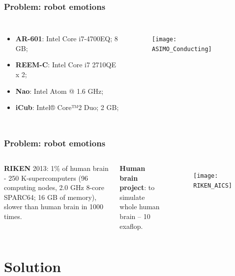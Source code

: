 \documentclass[12pt, aspectratio=169]{beamer}
\begin{document}
\begin{frame}
\frametitle{Problem: robot emotions}
\begin{columns}[c] %

\begin{itemize}
\item \textbf{AR-601}: Intel Core i7-4700EQ; 8 GB;
\item \textbf{REEM-C}: Intel Core i7 2710QE x 2;
\item \textbf{Nao}: Intel Atom @ 1.6 GHz;
\item \textbf{iCub}: Intel® Core™2 Duo; 2 GB;
\end{itemize}


\begin{figure}
\texttt{[image: ASIMO\_Conducting]}
\end{figure}
\end{columns}
\end{frame}


\begin{frame}
\frametitle{Problem: robot emotions}
\begin{columns}[c] %

\textbf{RIKEN} 2013: 1\% of human brain - 250 K-supercomputers
(96 computing nodes, 2.0 GHz 8-core SPARC64; 16 GB of memory), slower than human brain in 1000 times. 


\textbf{Human brain project}: to simulate whole human brain -- 10 exaflop.


\begin{figure}
\texttt{[image: RIKEN\_AICS]}
\end{figure}
\end{columns}
\end{frame}


\section{Solution}
\end{document}
